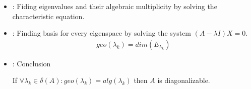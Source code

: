     \begin{itemize}
      \item {}: Fiding eigenvalues and their algebraic multiplicity
        by solving the characteristic equation.
      \item {}: Finding basis for every eigenspace by solving the
        system $(A - \lambda I) X = 0$.
        \begin{align*}
          geo(\lambda_{k}) = dim(E_{\lambda_{k}})
        \end{align*}
      \item {}: Conclusion
        \par If $\forall \lambda_{k} \in \delta(A):
          geo(\lambda_{k}) = alg(\lambda_{k})$ then $A$ is diagonalizable. 
    \end{itemize}


